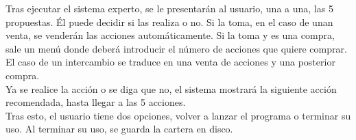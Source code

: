 Tras ejecutar el sistema experto, se le presentarán al usuario, una a una, las 5 propuestas. Él puede decidir si las realiza o no. Si la toma, en el caso de unan venta, se venderán las acciones automáticamente. Si la toma y es una compra, sale un menú donde deberá introducir el número de acciones que quiere comprar. El caso de un intercambio se traduce en una venta de acciones y una posterior compra.\\

Ya se realice la acción o se diga que no, el sistema mostrará la siguiente acción recomendada, hasta llegar a las 5 acciones.\\

Tras esto, el usuario tiene dos opciones, volver a lanzar el programa o terminar su uso. Al terminar su uso, se guarda la cartera en disco.\\
